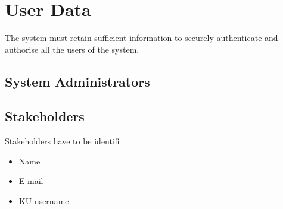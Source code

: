 
\section{User Data}

The system must retain sufficient information to securely authenticate and
authorise all the users of the system.

\subsection{System Administrators}

\subsection{Stakeholders}

Stakeholders have to be identifi

\begin{itemize}

\item Name

\item E-mail

\item KU username

\end{itemize}
